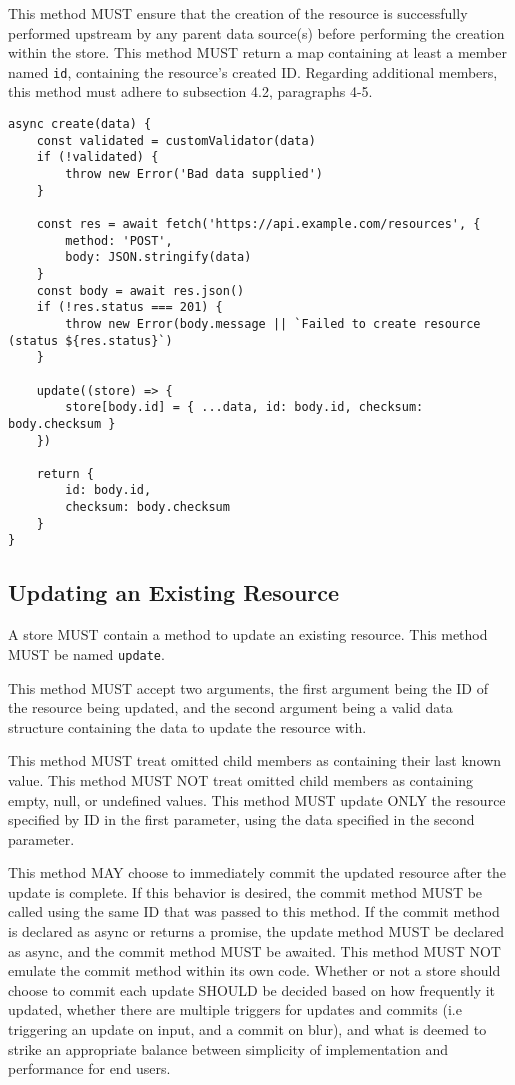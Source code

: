 \documentclass{article}
\begin{document}
This method MUST ensure that the creation of the resource is successfully performed upstream by any parent data source(s) before performing the creation within the store. This method MUST return a map containing at least a member named \verb|id|, containing the resource's created ID. Regarding additional members, this method must adhere to subsection 4.2, paragraphs 4-5.

\begin{lstlisting}[caption=Create Method]
async create(data) {
    const validated = customValidator(data)
    if (!validated) {
        throw new Error('Bad data supplied')
    }
    
    const res = await fetch('https://api.example.com/resources', {
        method: 'POST',
        body: JSON.stringify(data)
    }
    const body = await res.json()
    if (!res.status === 201) {
        throw new Error(body.message || `Failed to create resource (status ${res.status}`)
    }
    
    update((store) => {
        store[body.id] = { ...data, id: body.id, checksum: body.checksum }
    })
    
    return {
        id: body.id,
        checksum: body.checksum
    }
}
\end{lstlisting}

\subsection{Updating an Existing Resource}
A store MUST contain a method to update an existing resource. This method MUST be named \verb|update|.

This method MUST accept two arguments, the first argument being the ID of the resource being updated, and the second argument being a valid data structure containing the data to update the resource with.

This method MUST treat omitted child members as containing their last known value. This method MUST NOT treat omitted child members as containing empty, null, or undefined values. This method MUST update ONLY the resource specified by ID in the first parameter, using the data specified in the second parameter.

This method MAY choose to immediately commit the updated resource after the update is complete. If this behavior is desired, the commit method MUST be called using the same ID that was passed to this method. If the commit method is declared as async or returns a promise, the update method MUST be declared as async, and the commit method MUST be awaited. This method MUST NOT emulate the commit method within its own code. Whether or not a store should choose to commit each update SHOULD be decided based on how frequently it updated, whether there are multiple triggers for updates and commits (i.e triggering an update on input, and a commit on blur), and what is deemed to strike an appropriate balance between simplicity of implementation and performance for end users.
\end{document}
